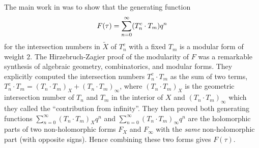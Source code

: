 The main work in \cite{HZ} was to show that the generating function
\[\vspace{-.1cm}
F(\tau) = \sum_{n=0}^{\infty} (T_n^c \cdot T_m) q^n \vspace{-.1cm}
\]
for the intersection numbers in $\tilde{X}$ of $T^c_n$ with a fixed
$T_m$ is a modular form of weight $2$. The Hirzebruch-Zagier proof
of the modularity of $F$ was a remarkable synthesis of algebraic
geometry, combinatorics, and modular forms. They explicitly computed
the intersection numbers $T_n^c \cdot T_m$ as the sum of two terms,
$T_n^c \cdot T_m = (T_n \cdot T_m)_X  + ({T}_n \cdot {T}_m)_{\infty}$,
where $(T_n \cdot T_m)_X $ is the geometric intersection number of
$T_n$ and $T_m$ in the interior of $X$ and $({T}_n \cdot {T}_m)_{\infty}$
which they called the ``contribution from infinity''. They then proved
both generating functions $\sum_{n=0}^{\infty} (T_n \cdot T_m)_X
q^n$ and $\sum_{n=0}^{\infty}  (T_n \cdot T_m)_{\infty} q^n$ are
the holomorphic parts of two non-holomorphic forms $F_X$ and
$F_{\infty}$ with the {\it same} non-holomorphic part (with opposite
signs). Hence combining these two forms gives $F(\tau)$.

